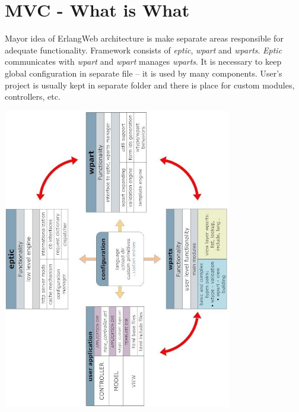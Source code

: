 \section{MVC - What is What}\label{MVC}
Mayor idea of ErlangWeb architecture is make separate areas responsible for
adequate functionality. Framework consists of \emph{eptic}, \emph{wpart} and
\emph{wparts}. \emph{Eptic} communicates with \emph{wpart} and \emph{wpart}
manages \emph{wparts}. It is necessary to keep global configuration in separate
file -- it is used by many components. User's project is usually kept in
separate folder and there is place for custom modules, controllers, etc.  

\begin{center}
\includegraphics[width=0.75\textwidth]{images/app_pic.jpg}
\end{center}
